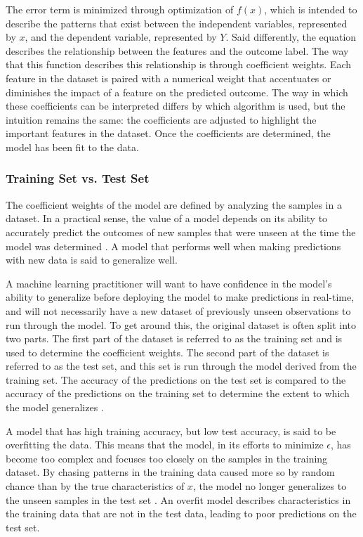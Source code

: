 \documentclass[sigconf]{acmart}
\begin{document}
The error term is minimized through optimization of \(f(x)\), which is intended to describe the patterns that exist between the independent variables, represented by \(x\), and the dependent variable, represented by \(Y\). Said differently, the equation describes the relationship between the features and the outcome label. The way that this function describes this relationship is through coefficient weights. Each feature in the dataset is paired with a numerical weight that accentuates or diminishes the impact of a feature on the predicted outcome. The way in which these coefficients can be interpreted differs by which algorithm is used, but the intuition remains the same: the coefficients are adjusted to highlight the important features in the dataset. Once the coefficients are determined, the model has been fit to the data.

\subsubsection{Training Set vs. Test Set}

The coefficient weights of the model are defined by analyzing the samples in a dataset. In a practical sense, the value of a model depends on its ability to accurately predict the outcomes of new samples that were unseen at the time the model was determined \cite{cite08}. A model that performs well when making predictions with new data is said to generalize well.

A machine learning practitioner will want to have confidence in the model's ability to generalize before deploying the model to make predictions in real-time, and will not necessarily have a new dataset of previously unseen observations to run through the model. To get around this, the original dataset is often split into two parts. The first part of the dataset is referred to as the training set and is used to determine the coefficient weights. The second part of the dataset is referred to as the test set, and this set is run through the model derived from the training set. The accuracy of the predictions on the test set is compared to the accuracy of the predictions on the training set to determine the extent to which the model generalizes \cite{cite08}.

A model that has high training accuracy, but low test accuracy, is said to be overfitting the data. This means that the model, in its efforts to minimize \(\epsilon\), has become too complex and focuses too closely on the samples in the training dataset. By chasing patterns in the training data caused more so by random chance than by the true characteristics of \(x\), the model no longer generalizes to the unseen samples in the test set \cite{cite03}\cite{cite08}. An overfit model describes characteristics in the training data that are not in the test data, leading to poor predictions on the test set.
\end{document}
